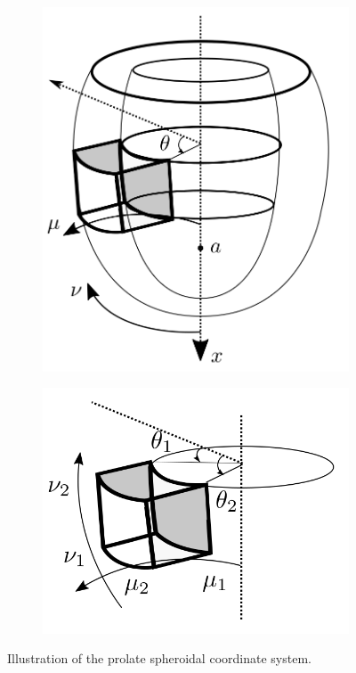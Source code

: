 \begin{figure}[htbp]
  \centering
  \begin{subfigure}[t]{0.4\textwidth}
    \includegraphics[width=\textwidth]{chapters/introduction/figures/geometry/prolate.png}
    \caption{\label{fig:prolate_coord}}
  \end{subfigure}
  \begin{subfigure}[t]{0.45\textwidth}
    \includegraphics[width=\textwidth]{chapters/introduction/figures/geometry/prolate_cube.png}
    \caption{\label{fig:prolate_cube}}
  \end{subfigure}
\caption{Illustration of the prolate spheroidal coordinate system.}
\label{fig:prolate}
\end{figure}

